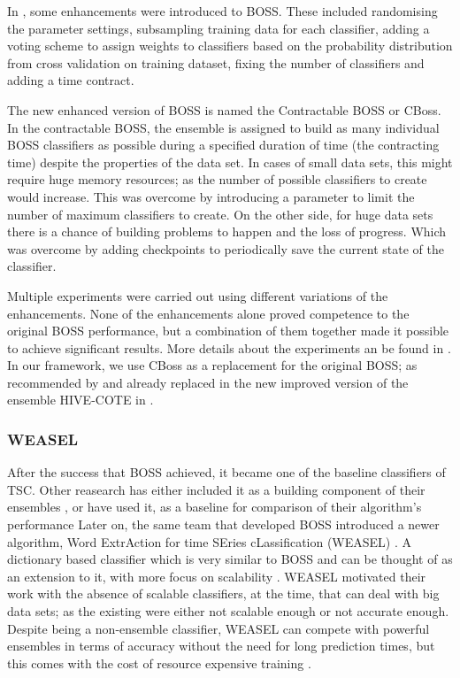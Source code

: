 In \cite{middlehurst2019scalable}, some enhancements were introduced to BOSS.
These included randomising the parameter settings, subsampling training data for each classifier,
adding a voting scheme to assign weights to classifiers based on the probability distribution from cross validation on training dataset,
fixing the number of classifiers and adding a time contract.

The new enhanced version of BOSS is named the Contractable BOSS or CBoss.
In the contractable BOSS, the ensemble is assigned to build as many individual BOSS classifiers as possible during a specified duration of time (the contracting time) despite the properties of the data set.
In cases of small data sets, this might require huge memory resources; as the number of possible classifiers to create would increase.
This was overcome by introducing a parameter to limit the number of maximum classifiers to create.
On the other side, for huge data sets there is a chance of building problems to happen and the loss of progress.
Which was overcome by adding checkpoints to periodically save the current state of the classifier.

Multiple experiments were carried out using different variations of the enhancements.
None of the enhancements alone proved competence to the original BOSS performance, but a combination of them together made it possible to achieve significant results.
More details about the experiments an be found in \cite{middlehurst2019scalable}.
In our framework, we use CBoss as a replacement for the original BOSS; as recommended by \cite{middlehurst2019scalable}
and already replaced in the new improved version of the ensemble HIVE-COTE in \cite{bagnall2020tale}.

\subsubsection{WEASEL}
\label{SubsubsectionWEASEL}
After the success that BOSS achieved, it became one of the baseline classifiers of TSC.
Other reasearch has either included it as a building component of their ensembles \cite{lines2018time, bagnall2015time},
or have used it, as a baseline for comparison of their algorithm's performance \cite{fawaz2020inceptiontime,shifaz2020ts,lucas2019proximity}
Later on, the same team that developed BOSS introduced a newer algorithm, Word ExtrAction for time SEries cLassification (WEASEL) \cite{schafer2017fast}.
A dictionary based classifier which is very similar to BOSS and can be thought of as an extension to it, with more focus on scalability \cite{middlehurst2019scalable}.
WEASEL motivated their work with the absence of scalable classifiers, at the time, that can deal with big data sets; as the existing were either not scalable enough
or not accurate enough. Despite being a non-ensemble classifier, WEASEL can compete with powerful ensembles in terms of accuracy without the need for
long prediction times, but this comes with the cost of resource expensive training \cite{middlehurst2019scalable}.

